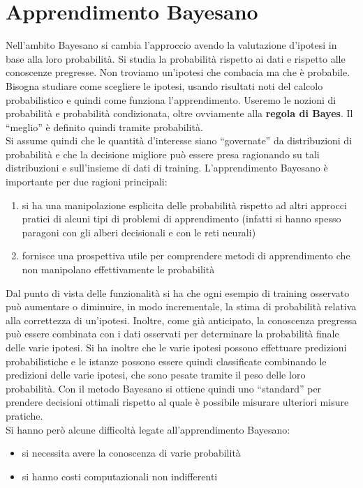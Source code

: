 \chapter{Apprendimento Bayesano}
\label{Capitolo 6}
Nell'ambito Bayesano si cambia l'approccio avendo la valutazione d'ipotesi in
base alla loro probabilità. Si studia la probabilità rispetto ai dati e rispetto
alle conoscenze pregresse. Non troviamo un'ipotesi che combacia ma che è
probabile.\\
Bisogna studiare come scegliere le ipotesi, usando risultati noti del calcolo
probabilistico e quindi come funziona l'apprendimento. Useremo le nozioni di
probabilità e probabilità condizionata, oltre ovviamente alla \textbf{regola di
  Bayes}. Il ``meglio'' è definito quindi tramite probabilità.\\
Si assume quindi che le quantità d'interesse siano ``governate'' da
distribuzioni di probabilità e che la decisione migliore può essere presa
ragionando su tali distribuzioni e sull'insieme di dati di
training. L'apprendimento Bayesano è importante per due ragioni principali:
\begin{enumerate}
  \item si ha una manipolazione esplicita delle probabilità rispetto ad altri
  approcci pratici di alcuni tipi di problemi di apprendimento (infatti si hanno
  spesso paragoni con gli alberi decisionali e con le reti neurali)
  \item fornisce una prospettiva utile per comprendere metodi di apprendimento
  che non manipolano effettivamente le probabilità
\end{enumerate}
Dal punto di vista delle funzionalità si ha che ogni esempio di training
osservato può aumentare o diminuire, in modo incrementale, la stima di
probabilità relativa alla correttezza di un'ipotesi. Inoltre, come già
anticipato, la conoscenza pregressa può essere combinata con i dati osservati
per determinare la probabilità finale delle varie ipotesi. Si ha inoltre che le
varie ipotesi possono effettuare predizioni probabilistiche e le istanze possono
essere quindi classificate combinando le predizioni delle varie ipotesi, che
sono pesate tramite il peso delle loro probabilità. Con il metodo Bayesano si
ottiene quindi uno ``standard'' per prendere decisioni ottimali rispetto al
quale è possibile misurare ulteriori misure pratiche.\\
Si hanno però alcune difficoltà legate all'apprendimento Bayesano:
\begin{itemize}
  \item si necessita avere la conoscenza di varie probabilità
  \item si hanno costi computazionali non indifferenti
\end{itemize}
